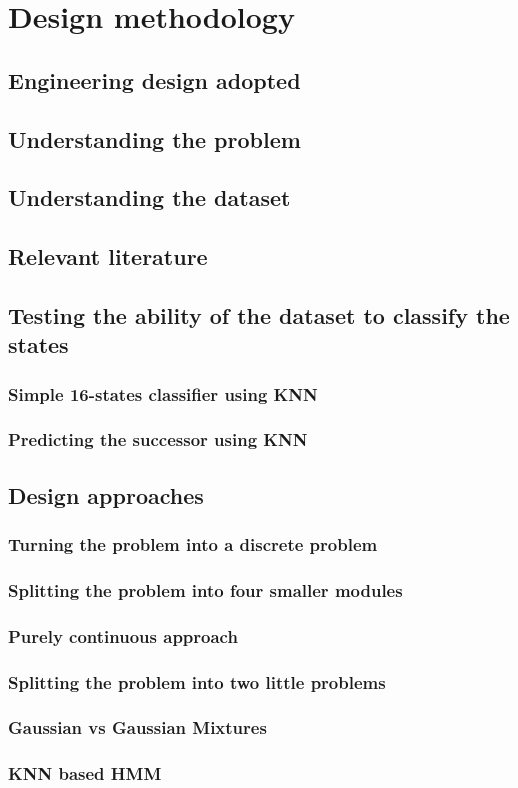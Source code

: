 \chapter{Design methodology}

\section{Engineering design adopted}
\section{Understanding the problem}
\section{Understanding the dataset}
\section{Relevant literature}
\section{Testing the ability of the dataset to classify the states}

\subsection{Simple 16-states classifier using KNN}
\subsection{Predicting the successor using KNN}

\section{Design approaches}

\subsection{Turning the problem into a discrete problem}
\subsection{Splitting the problem into four smaller modules}
\subsection{Purely continuous approach}
\subsection{Splitting the problem into two little problems}
\subsection{Gaussian vs Gaussian Mixtures}
\subsection{KNN based HMM}